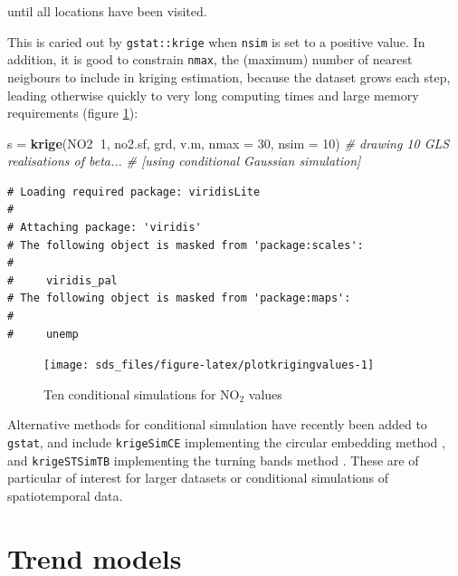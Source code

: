 \documentclass[]{book}
\newenvironment{Shaded}{\begin{snugshade}}{\end{snugshade}}
\newcommand{\CommentTok}[1]{\textcolor[rgb]{0.56,0.35,0.01}{\textit{#1}}}
\newcommand{\DataTypeTok}[1]{\textcolor[rgb]{0.13,0.29,0.53}{#1}}
\newcommand{\DecValTok}[1]{\textcolor[rgb]{0.00,0.00,0.81}{#1}}
\newcommand{\KeywordTok}[1]{\textcolor[rgb]{0.13,0.29,0.53}{\textbf{#1}}}
\newcommand{\NormalTok}[1]{#1}
\newcommand{\OperatorTok}[1]{\textcolor[rgb]{0.81,0.36,0.00}{\textbf{#1}}}
\newcommand{\StringTok}[1]{\textcolor[rgb]{0.31,0.60,0.02}{#1}}
\begin{document}
until all locations have been visited.

This is caried out by \texttt{gstat::krige} when \texttt{nsim} is set to a positive
value. In addition, it is good to constrain \texttt{nmax}, the (maximum)
number of nearest neigbours to include in kriging estimation,
because the dataset grows each step, leading otherwise quickly to
very long computing times and large memory requirements (figure
\ref{fig:plotkrigingvalues}):

\begin{Shaded}
\begin{Highlighting}[]
\NormalTok{s =}\StringTok{ }\KeywordTok{krige}\NormalTok{(NO2}\OperatorTok{~}\DecValTok{1}\NormalTok{, no2.sf, grd, v.m, }\DataTypeTok{nmax =} \DecValTok{30}\NormalTok{, }\DataTypeTok{nsim =} \DecValTok{10}\NormalTok{)}
\CommentTok{# drawing 10 GLS realisations of beta...}
\CommentTok{# [using conditional Gaussian simulation]}
\end{Highlighting}
\end{Shaded}



\begin{verbatim}
# Loading required package: viridisLite
# 
# Attaching package: 'viridis'
# The following object is masked from 'package:scales':
# 
#     viridis_pal
# The following object is masked from 'package:maps':
# 
#     unemp
\end{verbatim}

\begin{figure}

{\centering \texttt{[image: sds\_files/figure-latex/plotkrigingvalues-1]} 

}

\caption{Ten conditional simulations for NO\(_2\) values}\label{fig:plotkrigingvalues}
\end{figure}

Alternative methods for conditional simulation have recently been
added to \texttt{gstat}, and include \texttt{krigeSimCE} implementing the circular
embedding method \citep{JSSv055i09}, and \texttt{krigeSTSimTB} implementing
the turning bands method \citep{schlather}. These are of particular
of interest for larger datasets or conditional simulations of
spatiotemporal data.

\hypertarget{trend-models}{%
\section{Trend models}\label{trend-models}}
\end{document}
